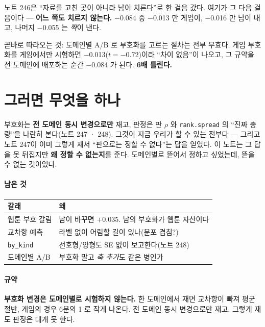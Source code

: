 \documentclass[10pt]{article}
\begin{document}
노트 246은 ``자료를 고친 곳이 아니라 남이 치른다''로 한 걸음 갔다. 여기가
그 다음 걸음이다 --- \textbf{어느 쪽도 치르지 않는다.} $-$0.084 중
$-$0.013 만 게임이, $-$0.016 만 남이 내고, 나머지 $-$0.055 는 \emph{짝}이
낸다.

곧바로 따라오는 것: 도메인별 A/B 로 부호화를 고르는 절차는 전부 무효다.
게임 부호화를 게임에서만 시험하면 $-$0.013($t{=}-0.72$)이라 ``차이 없음''이
나오고, 그 규약을 전 도메인에 배포하는 순간 $-$0.084 가 된다. \textbf{6배
틀린다.}

\section{그러면 무엇을 하나}

부호화는 \textbf{전 도메인 동시 변경으로만} 재고, 판정은 판 $\rho$ 와
\texttt{rank.spread} 의 ``진짜 총량''을 나란히 본다(노트 247 · 248). 그것이
지금 우리가 할 수 있는 전부다 --- 그리고 노트 247이 이미 그렇게 재서
``판으로는 정할 수 없다''는 답을 얻었다. 이 노트는 그 답을 못 뒤집지만
\textbf{왜 정할 수 없는지}를 준다. 도메인별로 뜯어서 정하고 싶었는데,
뜯을 수 없는 것이었다.

\paragraph{남은 것}
\begin{center}\small
\begin{tabular}{ll}
\hline
갈래 & 왜 \\
\hline
웹툰 부호 갈림 & 남이 바꾸면 $+$0.035. 남의 부호화가 웹툰 자산이다 \\
교차항 예측 & 라벨 없이 어림할 길이 있나(분포 겹침?) \\
\texttt{by\_kind} & 선호형/양형도 SE 없이 보고한다(노트 248) \\
도메인별 A/B & 부호화 말고 \emph{축 추가}도 같은 병인가 \\
\hline
\end{tabular}
\end{center}

\paragraph{규약} \textbf{부호화 변경은 도메인별로 시험하지 않는다.} 한
도메인에서 재면 교차항이 빠져 평균 절반, 게임의 경우 6분의 1 로 작게
나온다. 전 도메인 동시 변경으로만 재고, 그렇게 재도 판정은 대개 못 한다.
\end{document}

